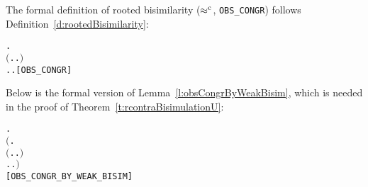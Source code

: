 The formal definition of rooted bisimilarity ($\mathrel{\approx^{\rm{c}}}$, \texttt{OBS_CONGR}) 
follows Definition~\ref{d:rootedBisimilarity}:
\begin{alltt}
    \HOLSymConst{\HOLTokenObsCongr}  \HOLSymConst{\HOLTokenDefEquality{}}
     \HOLSymConst{\HOLTokenForall{}}.
         \ensuremath{(}\HOLSymConst{\HOLTokenForall{}}.  \HOLTokenTransBegin{}\HOLTokenTransEnd {} \HOLSymConst{\HOLTokenImp{}} \HOLSymConst{\HOLTokenExists{}}.  \HOLTokenWeakTransBegin{}\HOLTokenWeakTransEnd {} \HOLSymConst{\HOLTokenConj{}}  \HOLSymConst{\HOLTokenWeakEQ} \ensuremath{)} \HOLSymConst{\HOLTokenConj{}}
         \HOLSymConst{\HOLTokenForall{}}.  \HOLTokenTransBegin{}\HOLTokenTransEnd {} \HOLSymConst{\HOLTokenImp{}} \HOLSymConst{\HOLTokenExists{}}.  \HOLTokenWeakTransBegin{}\HOLTokenWeakTransEnd {} \HOLSymConst{\HOLTokenConj{}}  \HOLSymConst{\HOLTokenWeakEQ} \hfill{[OBS_CONGR]}
\end{alltt}
Below is the formal version of Lemma~\ref{l:obsCongrByWeakBisim}, which is needed in the proof
of Theorem~\ref{t:rcontraBisimulationU}:
\begin{alltt}
\HOLTokenTurnstile{}   \HOLSymConst{\HOLTokenImp{}}
   \HOLSymConst{\HOLTokenForall{}} .
       \ensuremath{(}\HOLSymConst{\HOLTokenForall{}}.
            \ensuremath{(}\HOLSymConst{\HOLTokenForall{}}.  \HOLTokenTransBegin{}\HOLTokenTransEnd {} \HOLSymConst{\HOLTokenImp{}} \HOLSymConst{\HOLTokenExists{}}.  \HOLTokenWeakTransBegin{}\HOLTokenWeakTransEnd {} \HOLSymConst{\HOLTokenConj{}}   \ensuremath{)} \HOLSymConst{\HOLTokenConj{}}
            \HOLSymConst{\HOLTokenForall{}}.  \HOLTokenTransBegin{}\HOLTokenTransEnd {} \HOLSymConst{\HOLTokenImp{}} \HOLSymConst{\HOLTokenExists{}}.  \HOLTokenWeakTransBegin{}\HOLTokenWeakTransEnd {} \HOLSymConst{\HOLTokenConj{}}   \ensuremath{)} \HOLSymConst{\HOLTokenImp{}}
        \HOLSymConst{\HOLTokenObsCongr} \hfill{[OBS_CONGR_BY_WEAK_BISIM]}
\end{alltt}

